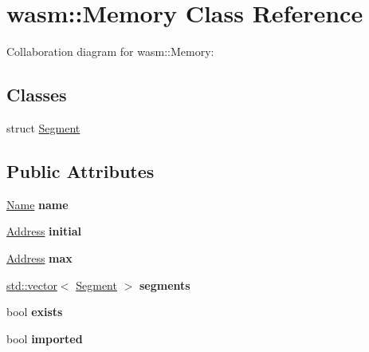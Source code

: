 \hypertarget{classwasm_1_1_memory}{}\section{wasm\+:\+:Memory Class Reference}
\label{classwasm_1_1_memory}


Collaboration diagram for wasm\+:\+:Memory\+:
\subsection*{Classes}
\begin{DoxyCompactItemize}
\item 
struct \mbox{\hyperlink{structwasm_1_1_memory_1_1_segment}{Segment}}
\end{DoxyCompactItemize}
\subsection*{Public Attributes}
\begin{DoxyCompactItemize}
\item 
\mbox{\label{classwasm_1_1_memory_a3b82d6b6e9a13739f2672cd4463bec36}} 
\mbox{\hyperlink{structwasm_1_1_name}{Name}} {\bfseries name}
\item 
\mbox{\label{classwasm_1_1_memory_aa47d9c4b7a1cce28003c5b8bf750c7f5}} 
\mbox{\hyperlink{structwasm_1_1_address}{Address}} {\bfseries initial}
\item 
\mbox{\label{classwasm_1_1_memory_aaf41b802f35c1beb0e2ff8f1688ca25b}} 
\mbox{\hyperlink{structwasm_1_1_address}{Address}} {\bfseries max}
\item 
\mbox{\label{classwasm_1_1_memory_a20c02d681c5c29eaf4868063dd06361a}} 
\mbox{\hyperlink{classstd_1_1vector}{std\+::vector}}$<$ \mbox{\hyperlink{structwasm_1_1_memory_1_1_segment}{Segment}} $>$ {\bfseries segments}
\item 
\mbox{\label{classwasm_1_1_memory_ac9260c167e1f77f6f897b470536ee163}} 
bool {\bfseries exists}
\item 
\mbox{\label{classwasm_1_1_memory_a4ce62043f38e435286fd00156abfd102}} 
bool {\bfseries imported}
\end{DoxyCompactItemize}
